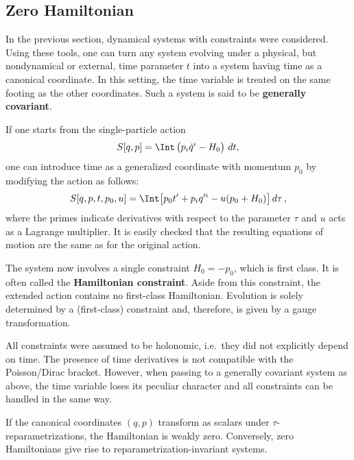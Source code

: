 \subsection{Zero Hamiltonian}

    In the previous section, dynamical systems with constraints were considered. Using these tools, one can turn any system evolving under a physical, but nondynamical or external, time parameter $t$ into a system having time as a canonical coordinate. In this setting, the time variable is treated on the same footing as the other coordinates. Such a system is said to be \textbf{generally covariant}.

    If one starts from the single-particle action
    \begin{gather}
        S[q,p] = \Int\left(p_i\dot{q}^i-H_0\right)\,dt,
    \end{gather}
    one can introduce time as a generalized coordinate with momentum $p_0$ by modifying the action as follows:
    \begin{gather}
        S[q,p,t,p_0,u] = \Int\bigl[p_0t'+p_iq'^i-u(p_0+H_0)\bigr]\,d\tau\,,
    \end{gather}
    where the primes indicate derivatives with respect to the parameter $\tau$ and $u$ acts as a Lagrange multiplier. It is easily checked that the resulting equations of motion are the same as for the original action.

    The system now involves a single constraint $H_0=-p_0$, which is first class. It is often called the \textbf{Hamiltonian constraint}. Aside from this constraint, the extended action contains no first-class Hamiltonian. Evolution is solely determined by a (first-class) constraint and, therefore, is given by a gauge transformation.

    \begin{remark}[Nonholonomicity]
        All constraints were assumed to be holonomic, i.e.~they did not explicitly depend on time. The presence of time derivatives is not compatible with the Poisson/Dirac bracket. However, when passing to a generally covariant system as above, the time variable loses its peculiar character and all constraints can be handled in the same way.
    \end{remark}

    \begin{property}
        If the canonical coordinates $(q,p)$ transform as scalars under $\tau$-reparametrizations, the Hamiltonian is weakly zero. Conversely, zero Hamiltonians give rise to reparametrization-invariant systems.
    \end{property}

